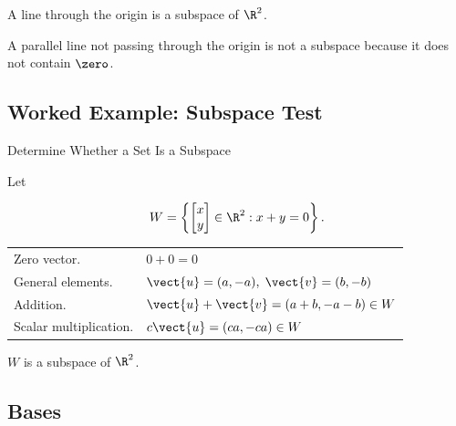 A line through the origin is a subspace of \(\R^2\).

\begin{center}
\end{center}

A parallel line not passing through the origin is not a subspace because it
does not contain \(\zero\).

\subsection{Worked Example: Subspace Test}
\label{subsec:worked-subspace}

\begin{workedexamplebox}{Determine Whether a Set Is a Subspace}

Let

\[ W=\left\{\begin{bmatrix}x\\y\end{bmatrix}\in\R^2:x+y=0\right\}. \]

\begin{tabularx}{\textwidth}{@{}>{\raggedright\arraybackslash}p{}X@{}}
Zero vector. & \(0+0=0\)\\
General elements. & \(\vect{u}=(a,-a),\;\vect{v}=(b,-b)\)\\
Addition. & \(\vect{u}+\vect{v}=(a+b,-a-b)\in W\)\\
Scalar multiplication. & \(c\vect{u}=(ca,-ca)\in W\)
\end{tabularx}

\begin{answerbox}
\(W\) is a subspace of \(\R^2\).
\end{answerbox}
\end{workedexamplebox}

\subsection{Bases}
\label{subsec:bases}

